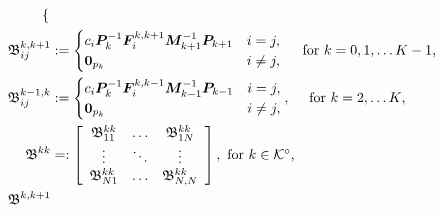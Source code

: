 \begin{align*}
\begin{cases}
\end{cases}
%
 \\\mathfrak{\bs B}^{k,k+1}_{ij} &:= \begin{cases}
	c_i\bs P_k^{-1}\bs F_i^{k,k+1}\bs M_{k+1}^{-1}\bs P_{k+1} & i = j, \\
	\bs 0_{p_k} & i \neq j,
    \end{cases}\quad \mbox{ for \(k=0,1,\dots K-1\),}
 \\\mathfrak{\bs B}^{k-1,k}_{ij} &:= \begin{cases}
    	c_i\bs P_k^{-1}\bs F_i^{k,k-1}\bs M_{k-1}^{-1}\bs P_{k-1} & i = j, \\
	\bs 0_{p_k} & i \neq j,
    \end{cases},\quad \mbox{ for \(k=2,\dots K\),}
\\
     {  {\mathfrak{\bs B}}}^{kk}%
    &=:\left[\begin{array}{ccc} {  {\mathfrak{\bs B}}}_{11}^{kk} &  \hdots &  {  {\mathfrak{\bs B}}}^{kk}_{1N}  \\ \vdots &\ddots & \vdots \\   {  {\mathfrak{\bs B}}}^{kk}_{N1} &  \hdots &  {  {\mathfrak{\bs B}}}^{kk}_{N,N} \end{array}\right], \mbox{ for \(k\in\mathcal K^\circ\),}
\\ {  {\mathfrak{\bs B}}}^{k,k+1}%

\end{align*}
